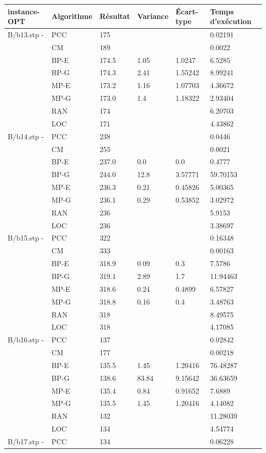 \documentclass[12pt,a4paper]{article}
\begin{document}
\begin{center}
	\begin{tabular}{l|l|l|l|l|l}
		instance-OPT & Algorithme & Résultat & Variance & Écart-type & Temps d'exécution\\ \hline \hline
		B/b13.stp - &PCC&175&&&0.02191\\
		&CM&189&&&0.0022\\
		&BP-E&174.5&1.05&1.0247&6.5285\\
		&BP-G&174.3&2.41&1.55242&8.99241\\
		&MP-E&173.2&1.16&1.07703&4.36672\\&MP-G&173.0&1.4&1.18322&2.93404\\
		&RAN&174&&&6.20703\\
		&LOC&171&&&4.43862\\\hline
		B/b14.stp - &PCC&238&&&0.0446\\
		&CM&255&&&0.0021\\
		&BP-E&237.0&0.0&0.0&0.4777\\
		&BP-G&244.0&12.8&3.57771&59.70153\\
		&MP-E&236.3&0.21&0.45826&5.00365\\&MP-G&236.1&0.29&0.53852&3.02972\\
		&RAN&236&&&5.9153\\
		&LOC&236&&&3.38697\\\hline
		B/b15.stp - &PCC&322&&&0.16348\\
		&CM&333&&&0.00163\\
		&BP-E&318.9&0.09&0.3&7.5786\\
		&BP-G&319.1&2.89&1.7&11.94463\\
		&MP-E&318.6&0.24&0.4899&6.57827\\&MP-G&318.8&0.16&0.4&3.48763\\
		&RAN&318&&&8.49575\\
		&LOC&318&&&4.17085\\\hline
		B/b16.stp - &PCC&137&&&0.02842\\
		&CM&177&&&0.00218\\
		&BP-E&135.5&1.45&1.20416&76.48287\\
		&BP-G&138.6&83.84&9.15642&36.63659\\
		&MP-E&135.4&0.84&0.91652&7.6889\\&MP-G&135.5&1.45&1.20416&4.14082\\
		&RAN&132&&&11.28039\\
		&LOC&134&&&4.54774\\\hline
		B/b17.stp - &PCC&134&&&0.06228\\

\end{tabular}
\end{center}
\end{document}
